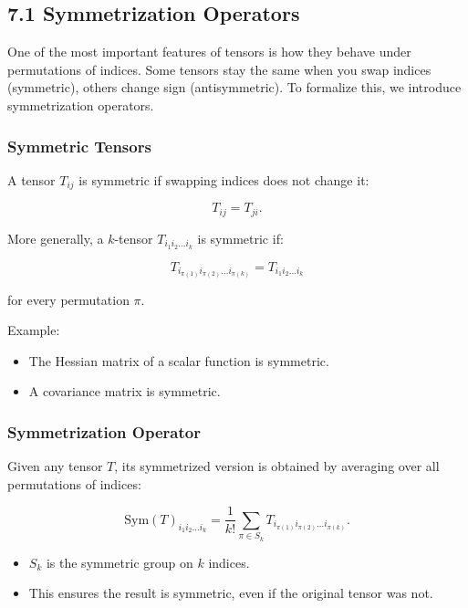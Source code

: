 \documentclass[
  letterpaper,
  DIV=11,
  numbers=noendperiod]{scrreprt}
\providecommand{\tightlist}{%
  \setlength{\itemsep}{0pt}\setlength{\parskip}{0pt}}
\begin{document}
\subsection{7.1 Symmetrization
Operators}\label{symmetrization-operators}

One of the most important features of tensors is how they behave under
permutations of indices. Some tensors stay the same when you swap
indices (symmetric), others change sign (antisymmetric). To formalize
this, we introduce symmetrization operators.

\subsubsection{Symmetric Tensors}\label{symmetric-tensors}

A tensor \(T_{ij}\) is symmetric if swapping indices does not change it:

\[
T_{ij} = T_{ji}.
\]

More generally, a \(k\)-tensor \(T_{i_1 i_2 \dots i_k}\) is symmetric
if:

\[
T_{i_{\pi(1)} i_{\pi(2)} \dots i_{\pi(k)}} = T_{i_1 i_2 \dots i_k}
\]

for every permutation \(\pi\).

Example:

\begin{itemize}
\tightlist
\item
  The Hessian matrix of a scalar function is symmetric.
\item
  A covariance matrix is symmetric.
\end{itemize}

\subsubsection{Symmetrization Operator}\label{symmetrization-operator}

Given any tensor \(T\), its symmetrized version is obtained by averaging
over all permutations of indices:

\[
\mathrm{Sym}(T)_{i_1 i_2 \dots i_k} = \frac{1}{k!} \sum_{\pi \in S_k} T_{i_{\pi(1)} i_{\pi(2)} \dots i_{\pi(k)}}.
\]

\begin{itemize}
\tightlist
\item
  \(S_k\) is the symmetric group on \(k\) indices.
\item
  This ensures the result is symmetric, even if the original tensor was
  not.
\end{itemize}
\end{document}
